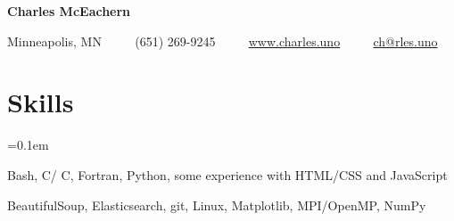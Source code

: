 \documentclass[11pt,letterpaper]{article}
\newcommand{\ResumeSection}[1]{
  \section*{ {\color{MidnightBlue}#1 \sout{\hfill} } } }
\newcommand{\URL}[1]{\href{#1}{#1}\xspace}
\newcommand{\CPP}{
  C\nolinebreak[4]\hspace{-.05em}\raisebox{.22ex}{\footnotesize\bf ++}\xspace}
\begin{document}


\begin{center}
  { \Huge \textbf{Charles McEachern} }

  \vspace{7pt}

  Minneapolis, MN
  \ \ \textbullet
  \ \ (651) 269-9245
  \ \ \textbullet
  \ \ \URL{www.charles.uno}
  \ \ \textbullet
  \ \ \href{mailto:ch@rles.uno}{ch@rles.uno}

  \vspace{3pt}

\end{center}


\ResumeSection{Skills}

\begin{description}[leftmargin=!, labelindent=\parindent,
                    labelwidth=\widthof{\bfseries Languages}]
  \parskip=0.1em

  \item[Languages]
    Bash, C/\CPP, Fortran, Python, some experience with HTML/CSS and JavaScript

  \item[Tools]
    BeautifulSoup, Elasticsearch, git, Linux, Matplotlib, MPI/OpenMP, NumPy

\end{description}

\end{document}
